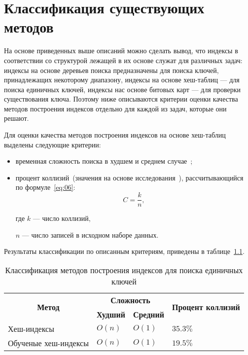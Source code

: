 \chapter{Классификация существующих методов\label{classification}}

На основе приведенных выше описаний можно сделать вывод, что индексы в
соответствии со структурой лежащей в их основе служат для различных задач:
индексы на основе деревьев поиска предназначены для поиска ключей, принадлежащих
некоторому диапазону, индексы на основе хеш-таблиц --- для поиска единичных
ключей, индексы нас основе битовых карт --- для проверки существования ключа.
Поэтому ниже описываются критерии оценки качества методов построения
индексов отдельно для каждой из задач, которые они решают.

Для оценки качества методов построения индексов на основе хеш-таблиц выделены
следующие критерии:
\begin{itemize}
    \item временная сложность поиска в худшем и среднем случае~\cite{main,
        squares};
    \item процент коллизий~(значения на основе исследования~\cite{main}),
        рассчитывающийся по формуле~\eqref{eq:06}:
        \begin{equation}\label{eq:06}
            C = \frac{k}{n},
        \end{equation}
        
      где $k$ --- число коллизий,
      
      $n$ --- число записей в исходном наборе данных.
\end{itemize}

Результаты классификации по описанным критериям, приведены в таблице~\ref{tab:02}.

{
\captionsetup{format=hang,justification=raggedleft,
              singlelinecheck=off,width=15.3cm}
\begin{longtable}[Hc]{|p{5.3cm}|p{2cm}|p{2cm}|p{2cm}|}
\caption{Классификация методов построения индексов для поиска единичных
ключей\label{tab:02}}\\
    \hline
    \multicolumn{1}{|c|}{\multirow{2}{*}{\textbf{Метод}}} &
    \multicolumn{2}{c|}{\textbf{Сложность}} &
    \multicolumn{1}{c|}{\multirow{2}{*}{\textbf{Процент коллизий}}}\\
    \cline{2-3}
    & \multicolumn{1}{c|}{\textbf{Худший}}
    & \multicolumn{1}{c|}{\textbf{Средний}}
    &\\
    \hline
    Хеш-индексы
    & $O(n)$
    & $O(1)$
    & $35.3\%$\\
    \hline
    Обученые хеш-индексы
    & $O(n)$
    & $O(1)$
    & $19.5\%$\\
    \hline
\end{longtable}
}


